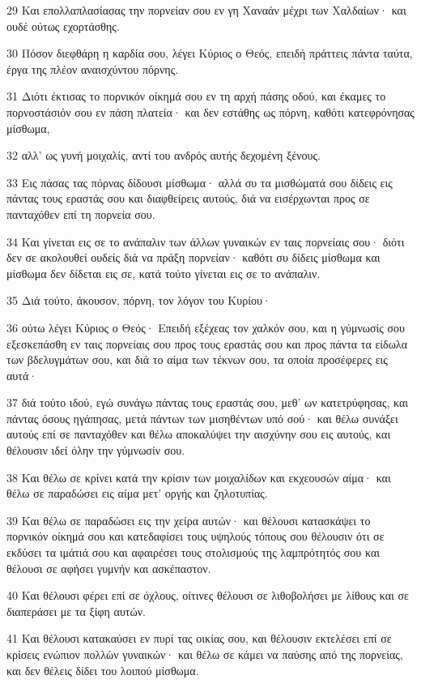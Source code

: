 \par 29 Και επολλαπλασίασας την πορνείαν σου εν γη Χαναάν μέχρι των Χαλδαίων· και ουδέ ούτως εχορτάσθης.
\par 30 Πόσον διεφθάρη η καρδία σου, λέγει Κύριος ο Θεός, επειδή πράττεις πάντα ταύτα, έργα της πλέον αναισχύντου πόρνης.
\par 31 Διότι έκτισας το πορνικόν οίκημά σου εν τη αρχή πάσης οδού, και έκαμες το πορνοστάσιόν σου εν πάση πλατεία· και δεν εστάθης ως πόρνη, καθότι κατεφρόνησας μίσθωμα,
\par 32 αλλ' ως γυνή μοιχαλίς, αντί του ανδρός αυτής δεχομένη ξένους.
\par 33 Εις πάσας τας πόρνας δίδουσι μίσθωμα· αλλά συ τα μισθώματά σου δίδεις εις πάντας τους εραστάς σου και διαφθείρεις αυτούς, διά να εισέρχωνται προς σε πανταχόθεν επί τη πορνεία σου.
\par 34 Και γίνεται εις σε το ανάπαλιν των άλλων γυναικών εν ταις πορνείαις σου· διότι δεν σε ακολουθεί ουδείς διά να πράξη πορνείαν· καθότι συ δίδεις μίσθωμα και μίσθωμα δεν δίδεται εις σε, κατά τούτο γίνεται εις σε το ανάπαλιν.
\par 35 Διά τούτο, άκουσον, πόρνη, τον λόγον του Κυρίου·
\par 36 ούτω λέγει Κύριος ο Θεός· Επειδή εξέχεας τον χαλκόν σου, και η γύμνωσίς σου εξεσκεπάσθη εν ταις πορνείαις σου προς τους εραστάς σου και προς πάντα τα είδωλα των βδελυγμάτων σου, και διά το αίμα των τέκνων σου, τα οποία προσέφερες εις αυτά·
\par 37 διά τούτο ιδού, εγώ συνάγω πάντας τους εραστάς σου, μεθ' ων κατετρύφησας, και πάντας όσους ηγάπησας, μετά πάντων των μισηθέντων υπό σού· και θέλω συνάξει αυτούς επί σε πανταχόθεν και θέλω αποκαλύψει την αισχύνην σου εις αυτούς, και θέλουσιν ιδεί όλην την γύμνωσίν σου.
\par 38 Και θέλω σε κρίνει κατά την κρίσιν των μοιχαλίδων και εκχεουσών αίμα· και θέλω σε παραδώσει εις αίμα μετ' οργής και ζηλοτυπίας.
\par 39 Και θέλω σε παραδώσει εις την χείρα αυτών· και θέλουσι κατασκάψει το πορνικόν οίκημά σου και κατεδαφίσει τους υψηλούς τόπους σου θέλουσιν ότι σε εκδύσει τα ιμάτιά σου και αφαιρέσει τους στολισμούς της λαμπρότητός σου και θέλουσι σε αφήσει γυμνήν και ασκέπαστον.
\par 40 Και θέλουσι φέρει επί σε όχλους, οίτινες θέλουσι σε λιθοβολήσει με λίθους και σε διαπεράσει με τα ξίφη αυτών.
\par 41 Και θέλουσι κατακαύσει εν πυρί τας οικίας σου, και θέλουσιν εκτελέσει επί σε κρίσεις ενώπιον πολλών γυναικών· και θέλω σε κάμει να παύσης από της πορνείας, και δεν θέλεις δίδει του λοιπού μίσθωμα.
